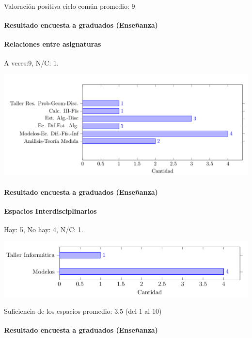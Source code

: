 \documentclass[a4paper,10pt,BCOR10mm,oneside,headsepline]{scrbook}
\begin{document}
Valoración positiva ciclo común promedio: 9 



\paragraph{Resultado encuesta a graduados (Enseñanza)}
\paragraph{Relaciones entre asignaturas}

A veces:9,   N/C: 1.


 \includegraphics[scale=.3]{barras1.png}








\paragraph{Resultado encuesta a graduados (Enseñanza)}
\paragraph{Espacios Interdisciplinarios}

Hay: 5, No hay: 4,  N/C: 1.


 \includegraphics[scale=.5]{barras2.png}
 
 Suficiencia de los espacios promedio: 3.5 (del 1 al 10)








\paragraph{Resultado encuesta a graduados (Enseñanza)}
\end{document}
